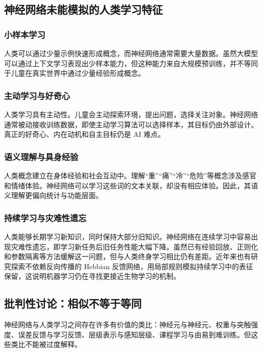 \documentclass[UTF8,zihao=-4,a4paper]{ctexart}
\begin{document}
\subsection{神经网络未能模拟的人类学习特征}

\subsubsection{小样本学习}

人类可以通过少量示例快速形成概念，而神经网络通常需要大量数据。虽然大模型可以通过上下文学习表现出少样本能力，但这种能力来自大规模预训练，并不等同于儿童在真实世界中通过少量经验形成概念。

\subsubsection{主动学习与好奇心}

人类学习具有主动性。儿童会主动探索环境，提出问题，选择关注对象。神经网络通常被动接收训练数据，即使主动学习算法可以选择样本，其目标仍由外部设计。真正的好奇心、内在动机和自主目标仍是 AI 难点。

\subsubsection{语义理解与具身经验}

人类概念建立在身体经验和社会互动中。理解“重”“痛”“冷”“危险”等概念涉及感官和情绪体验。神经网络可以学习这些词的文本关联，却没有相应体验。因此，其语义理解更偏向统计与功能层面。

\subsubsection{持续学习与灾难性遗忘}

人类能够长期学习新知识，同时保持大部分旧知识。神经网络在连续学习中容易出现灾难性遗忘，即学习新任务后旧任务性能大幅下降。虽然已有经验回放、正则化和参数隔离等方法缓解这一问题，但与人类终身学习相比仍有差距。近年来也有研究探索不依赖反向传播的 Hebbian 反馈网络，用局部规则模拟持续学习中的表征保留\cite{li2026hebbiancontinual}，这说明机器学习仍在寻找更接近生物学习的机制。

\subsection{批判性讨论：相似不等于等同}

神经网络与人类学习之间存在许多有价值的类比：神经元与神经元、权重与突触强度、误差反馈与学习反馈、层级表示与感知层级、课程学习与由易到难训练。但这些类比不能被过度解释。
\end{document}
